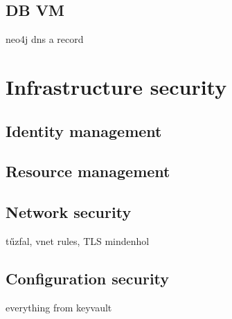 \subsection{DB VM}

neo4j dns a record

\section{Infrastructure security}
\subsection{Identity management}
\subsection{Resource management}
\subsection{Network security}
tűzfal, vnet rules, TLS mindenhol

\subsection{Configuration security}
everything from keyvault
